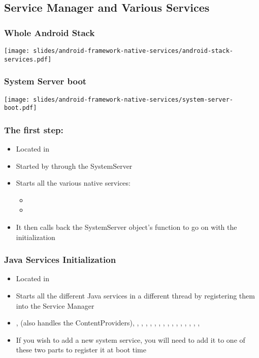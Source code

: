 \subsection{Service Manager and Various Services}

\begin{frame}
  \frametitle{Whole Android Stack}
  \begin{center}
    \texttt{[image: slides/android-framework-native-services/android-stack-services.pdf]}
  \end{center}
\end{frame}

\begin{frame}
  \frametitle{System Server boot}
  \begin{center}
    \texttt{[image: slides/android-framework-native-services/system-server-boot.pdf]}
  \end{center}
\end{frame}

\begin{frame}
  \frametitle{The first step: }
  \begin{itemize}
  \item Located in 
  \item Started by  through the SystemServer
  \item Starts all the various native services:
    \begin{itemize}
    \item {}
    \item {}
    \end{itemize}
  \item It then calls back the SystemServer object's  function to
    go on with the initialization
  \end{itemize}
\end{frame}

\begin{frame}
  \frametitle{Java Services Initialization}
  \begin{itemize}
  \item Located in
  \item Starts all the different Java services in a different thread
    by registering them into the Service Manager
  \item {},  (also handles the
    ContentProviders), , ,
    , , ,
    , ,
    , ,
    , ,
    , ,
    , , 
  \item If you wish to add a new system service, you will need to add
    it to one of these two parts to register it at boot time
  \end{itemize}
\end{frame}

